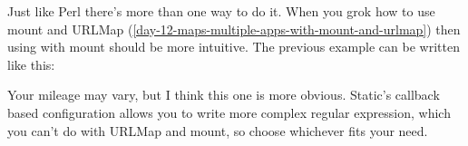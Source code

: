 Just like Perl there's more than one way to do it. When you grok how to
use mount and URLMap (\autoref{day-12-maps-multiple-apps-with-mount-and-urlmap}) 
then using  with mount should be more intuitive.
The previous example can be written like this:


Your mileage may vary, but I think this one is more obvious. Static's
callback based configuration allows you to write more complex regular
expression, which you can't do with URLMap and mount, so choose
whichever fits your need.

